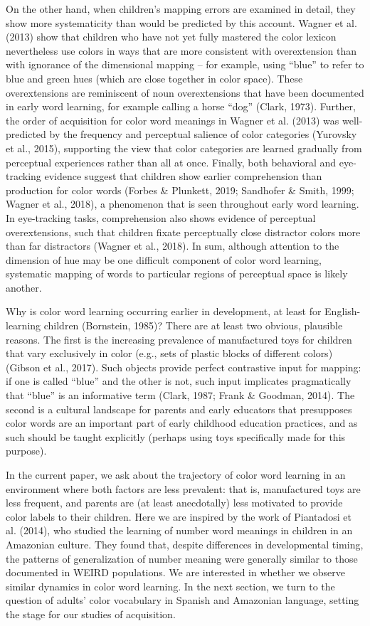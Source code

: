 \documentclass[
  ,apa7,floatsintext]{apa6}
\begin{document}
On the other hand, when children's mapping errors are examined in detail, they show more systematicity than would be predicted by this account. Wagner et al. (2013) show that children who have not yet fully mastered the color lexicon nevertheless use colors in ways that are more consistent with overextension than with ignorance of the dimensional mapping -- for example, using ``blue'' to refer to blue and green hues (which are close together in color space). These overextensions are reminiscent of noun overextensions that have been documented in early word learning, for example calling a horse ``dog'' (Clark, 1973). Further, the order of acquisition for color word meanings in Wagner et al. (2013) was well-predicted by the frequency and perceptual salience of color categories (Yurovsky et al., 2015), supporting the view that color categories are learned gradually from perceptual experiences rather than all at once. Finally, both behavioral and eye-tracking evidence suggest that children show earlier comprehension than production for color words (Forbes \& Plunkett, 2019; Sandhofer \& Smith, 1999; Wagner et al., 2018), a phenomenon that is seen throughout early word learning. In eye-tracking tasks, comprehension also shows evidence of perceptual overextensions, such that children fixate perceptually close distractor colors more than far distractors (Wagner et al., 2018). In sum, although attention to the dimension of hue may be one difficult component of color word learning, systematic mapping of words to particular regions of perceptual space is likely another.

Why is color word learning occurring earlier in development, at least for English-learning children (Bornstein, 1985)? There are at least two obvious, plausible reasons. The first is the increasing prevalence of manufactured toys for children that vary exclusively in color (e.g., sets of plastic blocks of different colors) (Gibson et al., 2017). Such objects provide perfect contrastive input for mapping: if one is called ``blue'' and the other is not, such input implicates pragmatically that ``blue'' is an informative term (Clark, 1987; Frank \& Goodman, 2014). The second is a cultural landscape for parents and early educators that presupposes color words are an important part of early childhood education practices, and as such should be taught explicitly (perhaps using toys specifically made for this purpose).

In the current paper, we ask about the trajectory of color word learning in an environment where both factors are less prevalent: that is, manufactured toys are less frequent, and parents are (at least anecdotally) less motivated to provide color labels to their children. Here we are inspired by the work of Piantadosi et al. (2014), who studied the learning of number word meanings in children in an Amazonian culture. They found that, despite differences in developmental timing, the patterns of generalization of number meaning were generally similar to those documented in WEIRD populations. We are interested in whether we observe similar dynamics in color word learning. In the next section, we turn to the question of adults' color vocabulary in Spanish and Amazonian language, setting the stage for our studies of acquisition.
\end{document}

